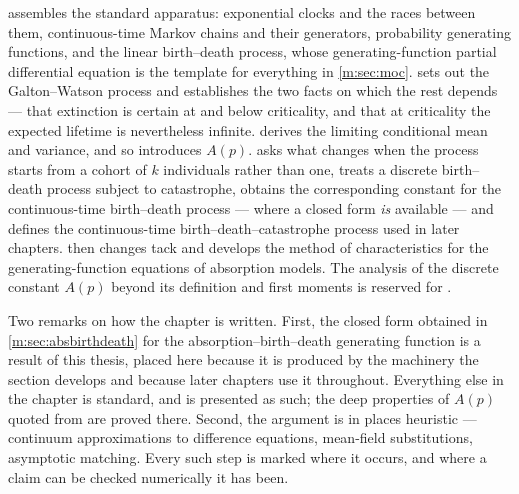  assembles the standard apparatus: exponential clocks and the
races between them, continuous-time Markov chains and their generators,
probability generating functions, and the linear birth--death process, whose
generating-function partial differential equation is the template for everything in
\cref{m:sec:moc}.  sets out the Galton--Watson process and establishes
the two facts on which the rest depends --- that extinction is certain at and below
criticality, and that at criticality the expected lifetime is nevertheless infinite.
 derives the limiting conditional mean and variance, and so
introduces $A(p)$.  asks what changes when the process starts from a
cohort of $k$ individuals rather than one, treats a discrete birth--death process
subject to catastrophe, obtains the corresponding constant for the continuous-time
birth--death process --- where a closed form \emph{is} available --- and defines the
continuous-time birth--death--catastrophe process used in later chapters.
 then changes tack and develops the method of characteristics for
the generating-function equations of absorption models. The analysis of the
discrete constant $A(p)$ beyond its definition and first moments is reserved for
\ChA.

Two remarks on how the chapter is written. First, the closed form obtained in
\cref{m:sec:absbirthdeath} for the absorption--birth--death generating function is
a result of this thesis, placed here because it is produced by the machinery the
section develops and because later chapters use it throughout. Everything else in
the chapter is standard, and is presented as such; the deep properties of $A(p)$
quoted from \ChA are proved there. Second, the argument is in places heuristic ---
continuum approximations to difference equations, mean-field substitutions,
asymptotic matching. Every such step is marked where it occurs, and where a claim
can be checked numerically it has been.
